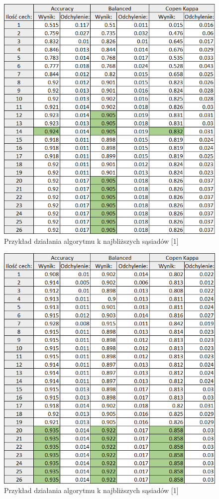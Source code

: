 \documentclass[12pt]{article}
\begin{document}
\begin{figure}[H]
	\centering
		\includegraphics[scale=0.9]{images/metrics/9nn_manhatan_norm_tab.png}
	\caption{Przykład działania algorytmu k najbliższych sąsiadów [1]}
\end{figure}
\begin{figure}[H]
	\centering
		\includegraphics[scale=0.9]{images/metrics/9nn_manhatan_beznorm_tab.png}
	\caption{Przykład działania algorytmu k najbliższych sąsiadów [1]}
\end{figure}
\end{document}
